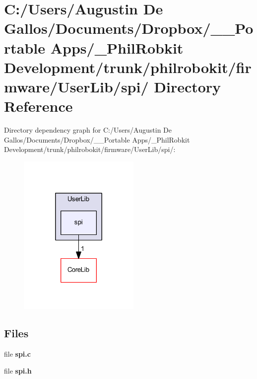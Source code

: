 \section{C\-:/\-Users/\-Augustin De Gallos/\-Documents/\-Dropbox/\-\_\-\-\_\-\-Portable Apps/\-\_\-\-Phil\-Robkit Development/trunk/philrobokit/firmware/\-User\-Lib/spi/ Directory Reference}
\label{dir_1c655e7adc70f634c9f46aa5c5b1a183}
Directory dependency graph for C\-:/\-Users/\-Augustin De Gallos/\-Documents/\-Dropbox/\-\_\-\-\_\-\-Portable Apps/\-\_\-\-Phil\-Robkit Development/trunk/philrobokit/firmware/\-User\-Lib/spi/\-:\nopagebreak
\begin{figure}[H]
\begin{center}
\leavevmode
\includegraphics[width=166pt]{dir_1c655e7adc70f634c9f46aa5c5b1a183_dep}
\end{center}
\end{figure}
\subsection*{Files}
\begin{DoxyCompactItemize}
\item 
file {\bf spi.\-c}
\item 
file {\bf spi.\-h}
\end{DoxyCompactItemize}
